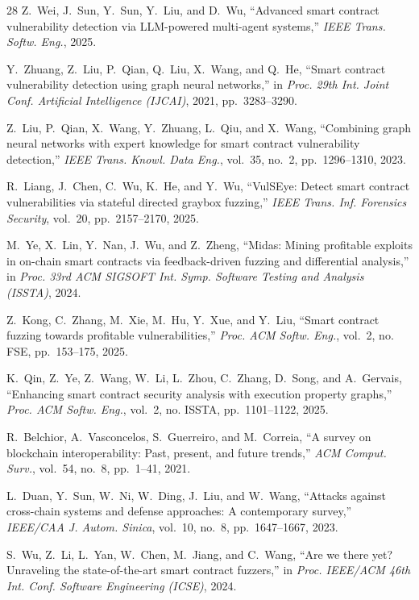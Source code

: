 \documentclass[journal]{IEEEtran}
\begin{document}
\begin{thebibliography}{28}
Z.~Wei, J.~Sun, Y.~Sun, Y.~Liu, and D.~Wu,
``Advanced smart contract vulnerability detection via LLM-powered multi-agent systems,''
\textit{IEEE Trans. Softw. Eng.}, 2025.

Y.~Zhuang, Z.~Liu, P.~Qian, Q.~Liu, X.~Wang, and Q.~He,
``Smart contract vulnerability detection using graph neural networks,''
in \textit{Proc. 29th Int. Joint Conf. Artificial Intelligence (IJCAI)}, 2021, pp.~3283--3290.

Z.~Liu, P.~Qian, X.~Wang, Y.~Zhuang, L.~Qiu, and X.~Wang,
``Combining graph neural networks with expert knowledge for smart contract vulnerability detection,''
\textit{IEEE Trans. Knowl. Data Eng.}, vol.~35, no.~2, pp.~1296--1310, 2023.

R.~Liang, J.~Chen, C.~Wu, K.~He, and Y.~Wu,
``VulSEye: Detect smart contract vulnerabilities via stateful directed graybox fuzzing,''
\textit{IEEE Trans. Inf. Forensics Security}, vol.~20, pp.~2157--2170, 2025.

M.~Ye, X.~Lin, Y.~Nan, J.~Wu, and Z.~Zheng,
``Midas: Mining profitable exploits in on-chain smart contracts via feedback-driven fuzzing and differential analysis,''
in \textit{Proc. 33rd ACM SIGSOFT Int. Symp. Software Testing and Analysis (ISSTA)}, 2024.

Z.~Kong, C.~Zhang, M.~Xie, M.~Hu, Y.~Xue, and Y.~Liu,
``Smart contract fuzzing towards profitable vulnerabilities,''
\textit{Proc. ACM Softw. Eng.}, vol.~2, no. FSE, pp.~153--175, 2025.

K.~Qin, Z.~Ye, Z.~Wang, W.~Li, L.~Zhou, C.~Zhang, D.~Song, and A.~Gervais,
``Enhancing smart contract security analysis with execution property graphs,''
\textit{Proc. ACM Softw. Eng.}, vol.~2, no. ISSTA, pp.~1101--1122, 2025.

R.~Belchior, A.~Vasconcelos, S.~Guerreiro, and M.~Correia,
``A survey on blockchain interoperability: Past, present, and future trends,''
\textit{ACM Comput. Surv.}, vol.~54, no.~8, pp.~1--41, 2021.

L.~Duan, Y.~Sun, W.~Ni, W.~Ding, J.~Liu, and W.~Wang,
``Attacks against cross-chain systems and defense approaches: A contemporary survey,''
\textit{IEEE/CAA J. Autom. Sinica}, vol.~10, no.~8, pp.~1647--1667, 2023.

S.~Wu, Z.~Li, L.~Yan, W.~Chen, M.~Jiang, and C.~Wang,
``Are we there yet? Unraveling the state-of-the-art smart contract fuzzers,''
in \textit{Proc. IEEE/ACM 46th Int. Conf. Software Engineering (ICSE)}, 2024.


\end{thebibliography}
\end{document}
